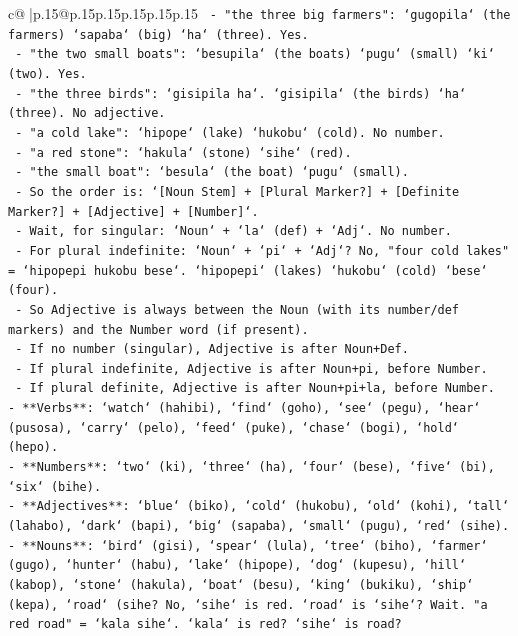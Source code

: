 \documentclass{article}
\begin{document}
{\begin{supertabular}{c@{$\;$}|p{.15\linewidth}@{}p{.15\linewidth}p{.15\linewidth}p{.15\linewidth}p{.15\linewidth}p{.15\linewidth}}
{{{\texttt{    {-} "the three big farmers": `gugopila` (the farmers) `sapaba` (big) `ha` (three). Yes.} \\
\texttt{    {-} "the two small boats": `besupila` (the boats) `pugu` (small) `ki` (two). Yes.} \\
\texttt{    {-} "the three birds": `gisipila ha`. `gisipila` (the birds) `ha` (three). No adjective.} \\
\texttt{    {-} "a cold lake": `hipope` (lake) `hukobu` (cold). No number.} \\
\texttt{    {-} "a red stone": `hakula` (stone) `sihe` (red).} \\
\texttt{    {-} "the small boat": `besula` (the boat) `pugu` (small).} \\
\texttt{    {-} So the order is: `{[}Noun Stem{]} + {[}Plural Marker?{]} + {[}Definite Marker?{]} + {[}Adjective{]} + {[}Number{]}`.} \\
\texttt{    {-} Wait, for singular: `Noun` + `la` (def) + `Adj`. No number.} \\
\texttt{    {-} For plural indefinite: `Noun` + `pi` + `Adj`? No, "four cold lakes" = `hipopepi hukobu bese`. `hipopepi` (lakes) `hukobu` (cold) `bese` (four).} \\
\texttt{    {-} So Adjective is always between the Noun (with its number/def markers) and the Number word (if present).} \\
\texttt{    {-} If no number (singular), Adjective is after Noun+Def.} \\
\texttt{    {-} If plural indefinite, Adjective is after Noun+pi, before Number.} \\
\texttt{    {-} If plural definite, Adjective is after Noun+pi+la, before Number.} \\
\texttt{{-} **Verbs**: `watch` (hahibi), `find` (goho), `see` (pegu), `hear` (pusosa), `carry` (pelo), `feed` (puke), `chase` (bogi), `hold` (hepo).} \\
\texttt{{-} **Numbers**: `two` (ki), `three` (ha), `four` (bese), `five` (bi), `six` (bihe).} \\
\texttt{{-} **Adjectives**: `blue` (biko), `cold` (hukobu), `old` (kohi), `tall` (lahabo), `dark` (bapi), `big` (sapaba), `small` (pugu), `red` (sihe).} \\
\texttt{{-} **Nouns**: `bird` (gisi), `spear` (lula), `tree` (biho), `farmer` (gugo), `hunter` (habu), `lake` (hipope), `dog` (kupesu), `hill` (kabop), `stone` (hakula), `boat` (besu), `king` (bukiku), `ship` (kepa), `road` (sihe? No, `sihe` is red. `road` is `sihe`? Wait. "a red road" = `kala sihe`. `kala` is red? `sihe` is road?} \\
}}}
\end{supertabular}}
\end{document}
